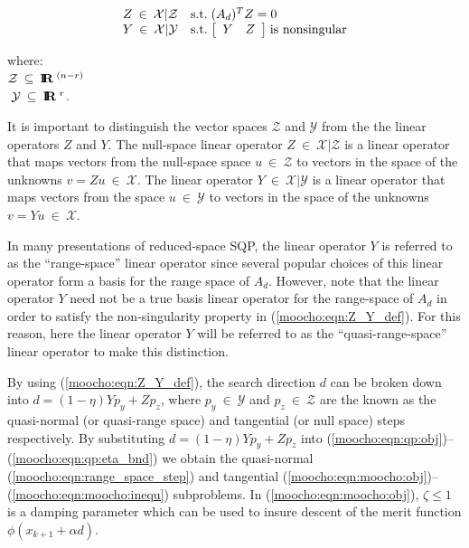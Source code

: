 \documentclass[pdf,12pt,report]{SANDreport}
\begin{document}
{\bsinglespace
\begin{equation}
\begin{array}{ll}
Z \:\in\:\mathcal{X}|\mathcal{Z}
	& \mbox{s.t.} \; (A_d)^T Z = 0 \\
Y \:\in\:\mathcal{X}|\mathcal{Y}
	& \mbox{s.t.} \; {\bmat{cc} Y & Z \emat} \; \mbox{is nonsingular}
\end{array}
\label{moocho:eqn:Z_Y_def}
\end{equation}
\begin{tabbing}
\hspace{4ex}where:\hspace{5ex}\= \\
\>	$\mathcal{Z} \:\subseteq\:\mbox{\textbf{I}}\hspace{-0.6ex}\mbox{\textbf{R}}\:^{(n-r)}$ \\
\>	$\; \mathcal{Y} \:\subseteq\:\mbox{\textbf{I}}\hspace{-0.6ex}\mbox{\textbf{R}}\:^{r}$.
\end{tabbing}
\esinglespace}
%
It is important to distinguish the vector spaces $\mathcal{Z}$ and
$\mathcal{Y}$ from the the linear operators $Z$ and $Y$.  The null-space
linear operator $Z\:\in\:\mathcal{X}|\mathcal{Z}$ is a linear operator that
maps vectors from the null-space space $u\:\in\:\mathcal{Z}$ to vectors in the
space of the unknowns $v = Z u \:\in\:\mathcal{X}$.  The linear operator
$Y\:\in\:\mathcal{X}|\mathcal{Y}$ is a linear operator that maps vectors from
the space $u\:\in\:\mathcal{Y}$ to vectors in the space of the unknowns $v = Y
u \:\in\:\mathcal{X}$.

In many presentations of reduced-space SQP, the linear operator $Y$ is
referred to as the ``range-space'' linear operator since several popular
choices of this linear operator form a basis for the range space of $A_d$.
However, note that the linear operator $Y$ need not be a true basis linear
operator for the range-space of $A_d$ in order to satisfy the non-singularity
property in (\ref{moocho:eqn:Z_Y_def}).  For this reason, here the linear
operator $Y$ will be referred to as the ``quasi-range-space'' linear operator
to make this distinction.

By using (\ref{moocho:eqn:Z_Y_def}), the search direction $d$ can be broken
down into $d = (1-\eta) Y p_y + Z p_z$, where $p_y \:\in\:\mathcal{Y}$ and
$p_z \:\in\:\mathcal{Z}$ are the known as the quasi-normal (or quasi-range
space) and tangential (or null space) steps respectively.  By substituting $d
= (1-\eta) Y p_y + Z p_z$ into
(\ref{moocho:eqn:qp:obj})--(\ref{moocho:eqn:qp:eta_bnd}) we obtain the
quasi-normal (\ref{moocho:eqn:range_space_step}) and tangential
(\ref{moocho:eqn:moocho:obj})--(\ref{moocho:eqn:moocho:inequ}) subproblems.  In
(\ref{moocho:eqn:moocho:obj}), $\zeta \leq 1 $ is a damping parameter which can
be used to insure descent of the merit function $\phi(x_{k+1}+\alpha
d)$.\\[1ex]
\end{document}
